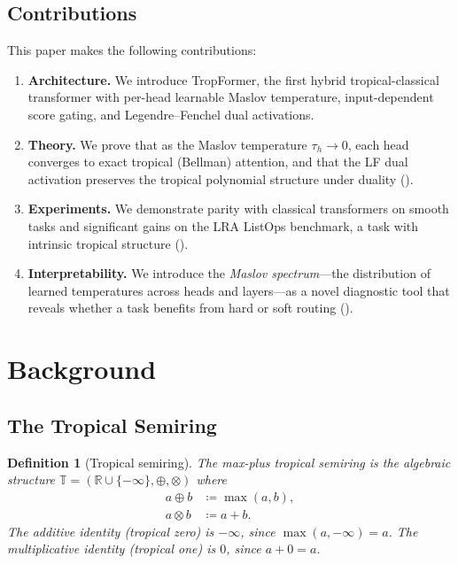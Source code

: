 \documentclass[11pt,twocolumn]{article}
\newtheorem{definition}[theorem]{Definition}
\newcommand{\R}{\mathbb{R}}
\newcommand{\T}{\mathbb{T}}
\newcommand{\tropplus}{\oplus}
\newcommand{\tropmult}{\otimes}
\begin{document}
\subsection{Contributions}

This paper makes the following contributions:
\begin{enumerate}[nosep]
  \item \textbf{Architecture.} We introduce TropFormer, the first hybrid
    tropical-classical transformer with per-head learnable Maslov temperature,
    input-dependent score gating, and Legendre--Fenchel dual activations.
  \item \textbf{Theory.} We prove that as the Maslov temperature $\tau_h \to 0$,
    each head converges to exact tropical (Bellman) attention, and that the
    LF dual activation preserves the tropical polynomial structure under
    duality ().
  \item \textbf{Experiments.} We demonstrate parity with classical transformers
    on smooth tasks and significant gains on the LRA ListOps benchmark, a task
    with intrinsic tropical structure ().
  \item \textbf{Interpretability.} We introduce the \emph{Maslov spectrum}---the
    distribution of learned temperatures across heads and layers---as a novel
    diagnostic tool that reveals whether a task benefits from hard or soft
    routing ().
\end{enumerate}

\section{Background}\label{sec:background}

\subsection{The Tropical Semiring}

\begin{definition}[Tropical semiring]
The \emph{max-plus tropical semiring} is the algebraic structure
$\T = (\R \cup \{-\infty\}, \tropplus, \tropmult)$ where
\begin{align}
  a \tropplus b &\coloneqq \max(a, b), \\
  a \tropmult b &\coloneqq a + b.
\end{align}
The additive identity (tropical zero) is $-\infty$, since
$\max(a, -\infty) = a$. The multiplicative identity (tropical one) is $0$,
since $a + 0 = a$.
\end{definition}
\end{document}
